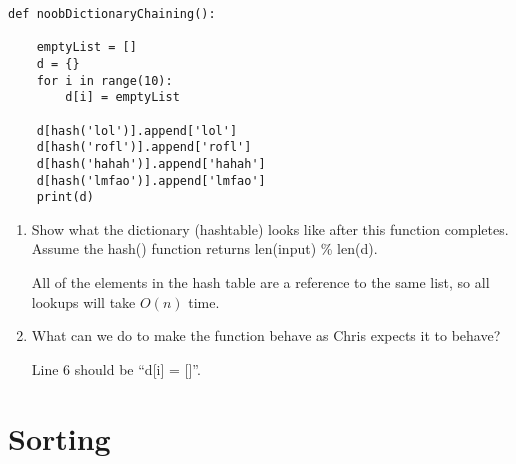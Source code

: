 \documentclass[11pt]{article}
\newenvironment{answer}{\large\lstset{basicstyle=\large}\color{white}}{}
\newenvironment{answer}{\large\lstset{basicstyle=\large}\color{red}}{}
\begin{document}
\begin{enumerate}
\begin{lstlisting}
def noobDictionaryChaining():

    emptyList = []
    d = {}
    for i in range(10):
        d[i] = emptyList

    d[hash('lol')].append['lol']
    d[hash('rofl')].append['rofl']
    d[hash('hahah')].append['hahah']
    d[hash('lmfao')].append['lmfao']
    print(d)
\end{lstlisting}

    \begin{enumerate}
    \item Show what the dictionary (hashtable) looks like after this function
          completes. Assume the hash() function returns len(input) \% len(d).

        \begin{answer}
        All of the elements in the hash table are a reference to the same list,
        so all lookups will take $O(n)$ time.
        \vspace{2in}
        \end{answer}

    \item What can we do to make the function behave as Chris expects it to
          behave?

        \begin{answer}
        Line 6 should be ``d[i] = []''.
        \end{answer}
    \end{enumerate}


\section*{Sorting}


\end{enumerate}
\end{document}
